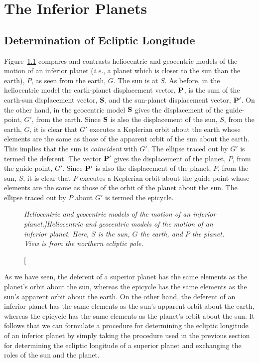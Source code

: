 \chapter{The Inferior Planets}\label{cinf}
\section{Determination of Ecliptic Longitude}
Figure~\ref{vf8} compares and contrasts heliocentric and geocentric models of the
motion  of an inferior planet ({\em i.e.}, a planet which is closer to the sun than the earth), $P$,  as seen from the earth, $G$. The sun is
at $S$.
As before, in the heliocentric
model  the earth-planet displacement vector, ${\bf P}$,
is the sum of the earth-sun displacement vector, ${\bf S}$, and
the sun-planet displacement vector, ${\bf P}'$.  
On the other hand, in the geocentric model ${\bf S}$ gives the displacement of
the guide-point, $G'$, from the earth. Since ${\bf S}$ is also the displacement of the sun, $S$,
from the earth, $G$, it is clear that $G'$ executes a Keplerian orbit about the earth whose elements
are the same as those of the apparent orbit of the sun about the earth. This implies that the sun is {\em coincident}\/
with $G'$. The ellipse traced out by $G'$ is termed the deferent.
The vector
${\bf P}'$ gives the displacement of the planet, $P$, from the
guide-point, $G'$. 
Since ${\bf P'}$ is also the displacement of the planet, $P$, from the sun, $S$, it is clear
that $P$ executes a Keplerian orbit about the guide-point whose elements are the same as
those of the orbit of the planet about the sun. The ellipse traced out by $P$ about $G'$ is
termed the epicycle.

\begin{figure}[h]
\epsfysize=2.75in
\centerline{}
\caption[\em Heliocentric and geocentric models of the motion of an inferior planet.]{\em Heliocentric and geocentric models of the motion of an inferior planet. Here, $S$ is the sun, $G$ the earth, and $P$ the planet. View is from the northern ecliptic pole.}\label{vf8}   
\end{figure}

As we have seen,  the deferent of a superior planet has the same elements as the planet's orbit about the sun,
whereas the epicycle has the same elements as the sun's apparent orbit about the earth. On the other
hand, the deferent of an inferior planet has the same elements as the sun's apparent orbit about the earth,
whereas the epicycle has the same elements as the planet's  orbit about the sun. It follows that we can
formulate a procedure for determining the ecliptic longitude of an inferior planet by simply taking the
procedure  used in the  previous section for determining the ecliptic longitude
of a superior planet and exchanging the roles of the sun and the planet.

